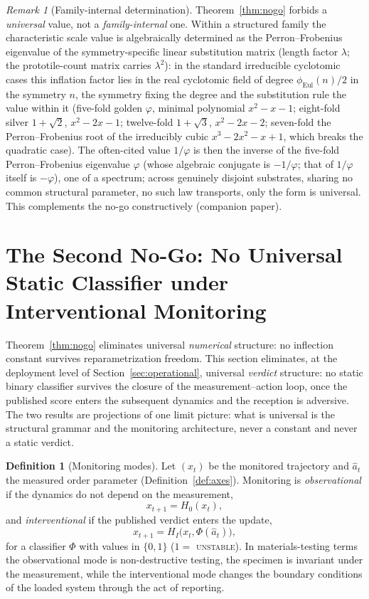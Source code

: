 \documentclass[11pt]{article}
\theoremstyle{plain}
\theoremstyle{definition}
\newtheorem{definition}[theorem]{Definition}
\theoremstyle{remark}
\newtheorem{remark}[theorem]{Remark}
\begin{document}
\begin{remark}[Family-internal determination]\label{rem:pisot}
Theorem~\ref{thm:nogo} forbids a \emph{universal} value, not a \emph{family-internal} one. Within a structured family the characteristic scale value is algebraically determined as the Perron--Frobenius eigenvalue of the symmetry-specific linear substitution matrix (length factor $\lambda$; the prototile-count matrix carries $\lambda^2$): in the standard irreducible cyclotomic cases this inflation factor lies in the real cyclotomic field of degree $\phi_{\mathrm{Eul}}(n)/2$ in the symmetry $n$, the symmetry fixing the degree and the substitution rule the value within it (five-fold golden $\varphi$, minimal polynomial $x^2-x-1$; eight-fold silver $1+\sqrt2$, $x^2-2x-1$; twelve-fold $1+\sqrt3$, $x^2-2x-2$; seven-fold the Perron--Frobenius root of the irreducibly cubic $x^3-2x^2-x+1$, which breaks the quadratic case). The often-cited value $1/\varphi$ is then the inverse of the five-fold Perron--Frobenius eigenvalue $\varphi$ (whose algebraic conjugate is $-1/\varphi$; that of $1/\varphi$ itself is $-\varphi$), one of a spectrum; across genuinely disjoint substrates, sharing no common structural parameter, no such law transports, only the form is universal. This complements the no-go constructively (companion paper).
\end{remark}

\section[The Second No-Go: No Static Classifier]{The Second No-Go: No Universal Static Classifier under Interventional Monitoring}\label{sec:nogo2}

Theorem~\ref{thm:nogo} eliminates universal \emph{numerical} structure: no inflection constant survives reparametrization freedom. This section eliminates, at the deployment level of Section~\ref{sec:operational}, universal \emph{verdict} structure: no static binary classifier survives the closure of the measurement--action loop, once the published score enters the subsequent dynamics and the reception is adversive. The two results are projections of one limit picture: what is universal is the structural grammar and the monitoring architecture, never a constant and never a static verdict.

\begin{definition}[Monitoring modes]\label{def:modes}
Let $(x_t)$ be the monitored trajectory and $\hat a_t$ the measured order parameter (Definition~\ref{def:axes}). Monitoring is \emph{observational} if the dynamics do not depend on the measurement,
\[
x_{t+1}=H_0(x_t),
\]
and \emph{interventional} if the published verdict enters the update,
\[
x_{t+1}=H_I\big(x_t,\Phi(\hat a_t)\big),
\]
for a classifier $\Phi$ with values in $\{0,1\}$ ($1=$ \textsc{unstable}). In materials-testing terms the observational mode is non-destructive testing, the specimen is invariant under the measurement, while the interventional mode changes the boundary conditions of the loaded system through the act of reporting.
\end{definition}
\end{document}
